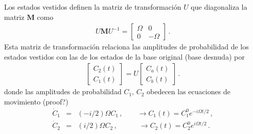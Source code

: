 \documentclass[twocolumn,aps,eqsecnum]{revtex4}
\begin{document}
Los estados vestidos definen la matriz de transformaci\'on 
$U$ que diagonaliza la matriz $\mathbf{M}$ como 
%
\begin{eqnarray*}
U \mathbf{M} U^{-1} = \left[ \begin{array}{cc} 
    \Omega & 0 \\ 0 & -\Omega \end{array} \right] \,.
\end{eqnarray*}
Esta matriz de transformaci\'on relaciona las amplitudes de 
probabilidad de los estados vestidos con las de los estados 
de la base original (base desnuda) por 
%
\begin{eqnarray*}
\left[ \begin{array}{c} C_2(t) \\ C_1(t) \end{array} \right] 
= U \left[ \begin{array}{c} C_a(t) \\ C_b(t) \end{array} \right]    \,.
\end{eqnarray*}
donde las amplitudes de probabilidad $C_1,\,C_2$ obedecen las 
ecuaciones de movimiento  (proof?) 
%
\begin{eqnarray*}
\dot{C}_1 &=& (-i/2) \Omega C_1 \,, 
    \qquad \to C_1(t) = C_1^0 e^{-i \Omega t/2} \,,\\ 
\dot{C}_2 &=& (i/2) \Omega C_2 \,, 
    \qquad \quad \to C_2(t) = C_2^0 e^{i \Omega t/2} \,.  
\end{eqnarray*}
\end{document}
